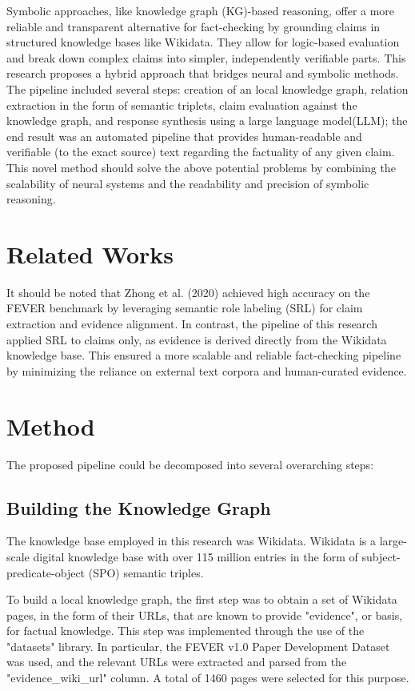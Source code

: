 \documentclass[11pt]{article}
\begin{document}
Symbolic approaches, like knowledge graph (KG)-based reasoning, offer a more reliable and transparent alternative for fact-checking by grounding claims in structured knowledge bases like Wikidata. They allow for logic-based evaluation and break down complex claims into simpler, independently verifiable parts.
This research proposes a hybrid approach that bridges neural and symbolic methods. The pipeline included several steps: creation of an local knowledge graph, relation extraction in the form of semantic triplets, claim evaluation against the knowledge graph, and response synthesis using a large language model(LLM); the end result was an automated pipeline that provides human-readable and verifiable (to the exact source) text regarding the factuality of any given claim. This novel method should solve the above potential problems by combining the scalability of neural systems and the readability and precision of symbolic reasoning. 

\section{Related Works}
It should be noted that Zhong et al. (2020)\cite{} achieved high accuracy on the FEVER benchmark by leveraging semantic role labeling (SRL) for claim extraction and evidence alignment. In contrast, the pipeline of this research applied SRL to claims only, as evidence is derived directly from the Wikidata knowledge base. This ensured a more scalable and reliable fact-checking pipeline by minimizing the reliance on external text corpora and human-curated evidence.

\section{Method}
The proposed pipeline could be decomposed into several overarching steps:

\subsection{Building the Knowledge Graph}
The knowledge base employed in this research was Wikidata. Wikidata is a large-scale digital knowledge base with over 115 million entries in the form of subject-predicate-object (SPO) semantic triples.

To build a local knowledge graph, the first step was to obtain a set of Wikidata pages, in the form of their URLs, that are known to provide "evidence", or basis, for factual knowledge. This step was implemented through the use of the "datasets" library. In particular, the FEVER v1.0 Paper Development Dataset\cite{} was used, and the relevant URLs were extracted and parsed from the "evidence\_wiki\_url" column. A total of 1460 pages were selected for this purpose. 
\end{document}
